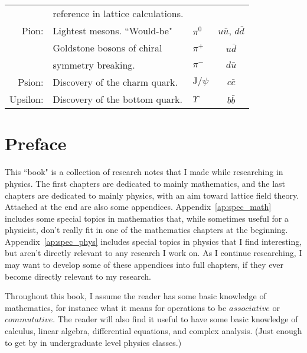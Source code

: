 \documentclass[12pt]{book}
\theoremstyle{definition}
\newenvironment{frontstuff}
  {\centering\chapter*{}}
  {\clearpage}
\begin{document}
\begin{frontstuff}
\begin{tabularx}{\linewidth}{rLlc}
         & reference in lattice calculations.
                                     &       &              
\vspace{2mm}\\
Pion:    & Lightest mesons. ``Would-be"
                                     & $\pi^0$ &   $u\bar{u}$,
                                                   $d\bar{d}$ \\
         & Goldstone bosons of chiral& $\pi^+$ &   $u\bar{d}$ \\
         & symmetry breaking.        & $\pi^-$ &   $d\bar{u}$
\vspace{2mm}\\
Psion:   & Discovery of the charm quark.
         & $\text{J}/\psi$                     &   $c\bar{c}$ 
\vspace{2mm}\\
Upsilon: & Discovery of the bottom quark.
         & $\Upsilon$                          &   $b\bar{b}$ \\
\end{tabularx}
\clearpage

\end{frontstuff} %

\chapter{Preface}
This ``book" is a collection of research notes that I made while researching in
physics. The first chapters are dedicated to mainly mathematics, and the last
chapters are dedicated to mainly physics, with an aim toward lattice field
theory. Attached at the end are also some appendices. 
Appendix~\ref{ap:spec_math} includes some special topics in mathematics 
that, while sometimes useful for a physicist, don't really fit in one of 
the mathematics chapters at the beginning. Appendix~\ref{ap:spec_phys} includes
special topics in physics that I find interesting, but aren't directly
relevant to any research I work on. As I continue researching, I may want
to develop some of these appendices into full chapters, if they ever
become directly relevant to my research.

Throughout this book, I assume the reader has some basic knowledge of 
mathematics, for instance what it means for operations to be $associative$ or 
$commutative$. The reader will also find it useful to have some basic knowledge
of calculus, linear algebra, differential equations, and complex analysis.
(Just enough to get by in undergraduate level physics classes.) 
\end{document}
